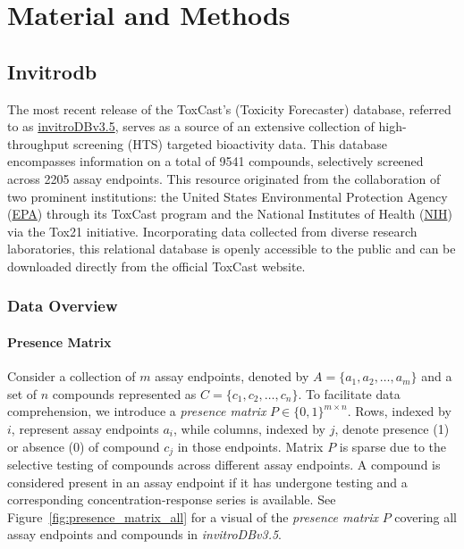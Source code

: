 \chapter{Material and Methods}
\section{Invitrodb}
The most recent release of the ToxCast's (Toxicity Forecaster) database, referred to as \href{https://cfpub.epa.gov/si/si_public_record_Report.cfm?dirEntryId=355484&Lab=CCTE}{invitroDBv3.5}, serves as a source of an extensive collection of high-throughput screening (HTS) targeted bioactivity data. This database encompasses information on a total of 9541 compounds, selectively screened across 2205 assay endpoints. This resource originated from the collaboration of two prominent institutions: the United States Environmental Protection Agency (\href{https://www.epa.gov/chemical-research/exploring-toxcast-data}{EPA}) through its ToxCast program and the National Institutes of Health (\href{https://ntp.niehs.nih.gov/whatwestudy/tox21}{NIH}) via the Tox21 initiative. Incorporating data collected from diverse research laboratories, this relational database is openly accessible to the public and can be downloaded directly from the official ToxCast website.


\subsection{Data Overview}
\subsubsection{Presence Matrix}
Consider a collection of $m$ assay endpoints, denoted by $A = \{a_1, a_2, \dots, a_m\}$ and a set of $n$ compounds represented as $C = \{c_1, c_2, \dots, c_n\}$.
To facilitate data comprehension, we introduce a \emph{presence matrix} $P \in {\{0, 1\}}^{m \times n}$. Rows, indexed by $i$, represent assay endpoints $a_i$, while columns, indexed by $j$, denote presence (1) or absence (0) of compound $c_j$ in those endpoints. Matrix $P$ is sparse due to the selective testing of compounds across different assay endpoints. A compound is considered present in an assay endpoint if it has undergone testing and a corresponding concentration-response series is available.
See Figure~\ref{fig:presence_matrix_all} for a visual of the \emph{presence matrix} $P$ covering all assay endpoints and compounds in \textit{invitroDBv3.5}. 

